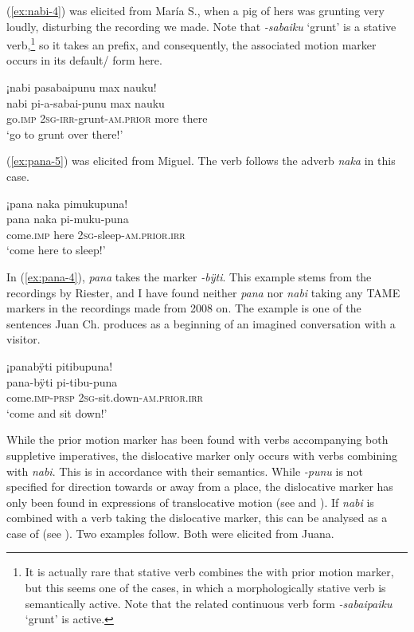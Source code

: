 (\ref{ex:nabi-4}) was elicited from María S., when a pig of hers was grunting very loudly, disturbing the recording we made. Note that \textit{-sabaiku} ‘grunt’ is a stative verb,\footnote{It is actually rare that stative verb combines the with prior motion marker, but this seems one of the cases, in which a morphologically stative verb is semantically active. Note that the related continuous verb form \textit{-sabaipaiku} ‘grunt’ is active.} so it takes an  prefix, and consequently, the associated motion marker occurs in its default/ form here.

\ea\label{ex:nabi-4}
\begingl
\glpreamble ¡nabi pasabaipunu max nauku!\\
\gla nabi pi-a-sabai-punu max nauku\\
\glb go.\textsc{imp} 2\textsc{sg}-\textsc{irr}-grunt-\textsc{am.prior} more there\\
\glft ‘go to grunt over there!’
\endgl
\trailingcitation{[rmx-e150922l.159]}
\xe

(\ref{ex:pana-5}) was elicited from Miguel. The verb follows the adverb \textit{naka} in this case.

\ea\label{ex:pana-5}
\begingl
\glpreamble ¡pana naka pimukupuna!\\
\gla pana naka pi-muku-puna\\
\glb come.\textsc{imp} here 2\textsc{sg}-sleep-\textsc{am.prior.irr}\\
\glft ‘come here to sleep!’
\endgl
\trailingcitation{[mxx-e160811sd.232]}
\xe

In (\ref{ex:pana-4}), \textit{pana} takes the  marker \textit{-bÿti}. This example stems from the recordings by Riester, and I have found neither \textit{pana} nor \textit{nabi} taking any TAME markers in the recordings made from 2008 on. The example is one of the sentences Juan Ch. produces as a beginning of an imagined conversation with a visitor.

\ea\label{ex:pana-4}
\begingl
\glpreamble ¡panabÿti pitibupuna!\\
\gla pana-bÿti pi-tibu-puna\\
\glb come.\textsc{imp}-\textsc{prsp} 2\textsc{sg}-sit.down-\textsc{am.prior.irr}\\
\glft ‘come and sit down!’
\endgl
\trailingcitation{[nxx-p630101g-2.07]}
\xe

While the prior motion marker has been found with verbs accompanying both suppletive imperatives, the dislocative marker only occurs with verbs combining with \textit{nabi}. This is in accordance with their semantics. While \textit{-punu} is not specified for direction towards or away from a place, the dislocative marker has only been found in expressions of translocative motion (see  and ). If \textit{nabi} is combined with a verb taking the dislocative marker, this can be analysed as a case of  (see ). Two examples follow. Both were elicited from Juana.


